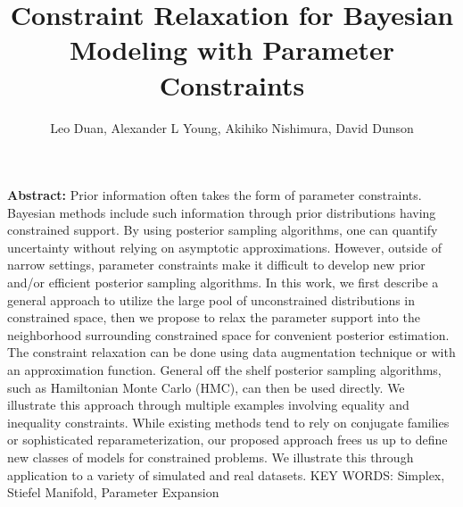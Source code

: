 \documentclass[10pt,fleqn]{article}
\title{\textbf{Constraint Relaxation for Bayesian Modeling with Parameter Constraints}}
\author{Leo Duan, Alexander L Young, Akihiko Nishimura,  David Dunson}
\date{}
\DeclareMathOperator{\1}{\mathbbm{1}}
\begin{document}
\maketitle
{\bf Abstract:} Prior information often takes  the form of parameter constraints. Bayesian methods include such information through prior distributions having constrained support. By using posterior sampling algorithms, one can quantify uncertainty without relying on asymptotic approximations. However, outside of narrow settings, parameter constraints
make it difficult to develop new  prior and/or   efficient posterior sampling algorithms. In this work, we first describe a general approach to utilize
the large pool of unconstrained distributions in constrained space,  then we propose to relax the parameter support  into the neighborhood surrounding constrained
space for convenient posterior estimation. The constraint relaxation can
be done using data augmentation technique or    with an approximation function. General off the shelf posterior sampling algorithms, such as Hamiltonian Monte Carlo (HMC), can then be used directly. We illustrate this approach through multiple examples involving equality and inequality constraints. While existing methods tend to rely on conjugate families or sophisticated reparameterization, our proposed approach frees us up to define new classes of  models for constrained problems. We illustrate this through application to a variety of simulated and real datasets.
\vskip 12pt
{\noindent KEY WORDS: Simplex,  Stiefel Manifold, Parameter Expansion}
{}
\end{document}
